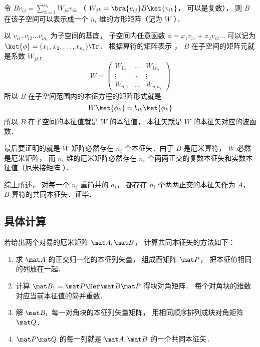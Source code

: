 令 $B v_{ij} = \sum_{k=1}^{n_i} W_{jk}v_{ik}$ （ $W_{jk} = \bra{v_{ij}} B \ket{v_{ik}}$， 可以是复数）， 则 $B$ 在该子空间可以表示成一个 $n_i$ 维的方形矩阵（记为 $W$ ）．

以 $v_{i1}, v_{i2} \dots v_{i n_i}$ 为子空间的基底， 子空间内任意函数 $\phi  = x_1 v_{i1} + x_2 v_{i2}\dots$ 可以记为 $\ket{\phi} = (x_1, x_2, \dots, x_{n_i})\Tr$． 根据算符的矩阵表示
， $B$ 在子空间的矩阵元就是系数 $W_{jk}$， 
\begin{equation}
W = \begin{pmatrix}
W_{11} & \ldots & W_{1 n_i}\\
\vdots & \ddots & \vdots \\
W_{n_i 1} & \ldots & W_{n_i n_i}
\end{pmatrix}
\end{equation}
所以 $B$ 在子空间范围内的本征方程的矩阵形式就是
\begin{equation}
W \ket{\phi_k} = b_{ik} \ket{\phi_k}
\end{equation}
所以 $B$ 在子空间的本征值就是 $W$ 的本征值， 本征矢就是 $W$ 的本征矢对应的波函数．

最后要证明的就是 $W$ 矩阵必然存在 $n_i$ 个本征矢．由于 $B$ 是厄米算符，  $W$ 必然是厄米矩阵， 而 $n_i$ 维的厄米矩阵必然存在 $n_i$ 个两两正交的复数本征矢和实数本征值（厄米接矩阵%
）．

综上所述， 对每一个 $n_i$ 重简并的 $a_i$，  都存在 $n_i$ 个两两正交的本征矢作为 $A$，  $B$ 算符的共同本征矢．证毕．

\subsection{具体计算}
若给出两个对易的厄米矩阵 $\mat A, \mat B$， 计算共同本征矢的方法如下：
\begin{enumerate}
\item 求 $\mat A$ 的正交归一化的本征列矢量， 组成酉矩阵 $\mat P$， 把本征值相同的列放在一起．
\item 计算 $\mat B_1 = \mat P\Her \mat B\mat P$ 得块对角矩阵． 每个对角块的维数对应当前本征值的简并重数．
\item 解 $\mat B_1$ 每一对角块的本征列矢量矩阵， 用相同顺序排列成块对角矩阵 $\mat Q$．
\item $\mat P\mat Q$ 的每一列就是 $\mat A, \mat B$ 的一个共同本征矢．
\end{enumerate}

